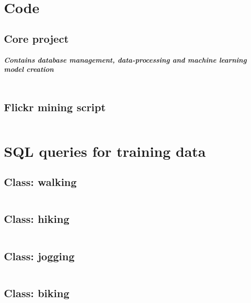 \appendix

\chapter{Code} \label{python_code}

\section{Core project}
\paragraph*{Contains database management, data-processing and machine learning model creation}
\inputminted[linenos, fontsize=\tiny]{python}{code/fusion_file_appendix.py}
\clearpage

\section{Flickr mining script}
\inputminted[linenos, fontsize=\tiny]{python}{code/flickr_mining_Kt_Zug_Appendix.py}
\clearpage


\chapter{SQL queries for training data} \label{sql_queries_for_trainingdata}

\section{Class: walking}

\inputminted[linenos]{sql}{code/walking.txt}
\clearpage

\section{Class: hiking}

\inputminted[linenos]{sql}{code/hiking.txt}
\clearpage

\section{Class: jogging}

\inputminted[linenos]{sql}{code/jogging.txt}
\clearpage

\section{Class: biking}

